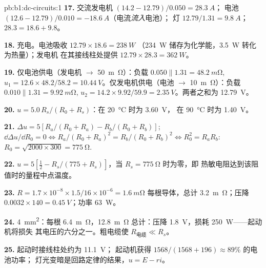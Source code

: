 \begin{solution}{pb:b1:dc-circuits:1}
\textbf{17.} 交流发电机 $(14.2 - 12.79)/0.050 = \qty{28.3}{A}$；
电池 $(12.6 - 12.79)/0.010 = \qty{-18.6}{A}$（电流\emph{流入}电池）；
灯 $12.79/1.31 = \qty{9.8}{A}$；$28.3 = 18.6 + 9.8$。

\textbf{18.} 充电。电池吸收 $12.79 \times 18.6 = \qty{238}{W}$
（\qty{234}{W} 储存为化学能，\qty{3.5}{W} 转化为热量）；发电机
在其接线柱处提供 $12.79 \times 28.3 = \qty{362}{W}$。

\textbf{19.} 仅电池供电（发电机 $\to$ \qty{50}{m\ohm}）：负载
$0.050 \parallel 1.31 = \qty{48.2}{m\ohm}$, $u_1 = 12.6 \times 48.2/58.2 =
\qty{10.44}{V}$。仅发电机供电（电池 $\to$ \qty{10}{m\ohm}）：负载
$0.010 \parallel 1.31 = \qty{9.92}{m\ohm}$, $u_2 = 14.2 \times 9.92/59.9 =
\qty{2.35}{V}$。两者之和为 \qty{12.79}{V}。

\textbf{20.} $u = 5.0\,R_s/(R_0 + R_s)$：在 \qty{20}{\degreeCelsius} 时为 \qty{3.60}{V}，
在 \qty{90}{\degreeCelsius} 时为 \qty{1.40}{V}。

\textbf{21.} $\Delta u = 5[R_a/(R_0 + R_a) - R_b/(R_0 + R_b)]$;
$\dd\Delta u/\dd R_0 = 0 \Leftrightarrow R_a/(R_0 + R_a)^2 = R_b/(R_0 +
R_b)^2 \Leftrightarrow R_0^2 = R_aR_b$: $R_0 = \sqrt{2000 \times 300} =
\qty{775}{\ohm}$.

\textbf{22.} $u = 5[\tfrac12 - R_s/(775 + R_s)]$，当 $R_s =
\qty{775}{\ohm}$ 时为零，即
热敏电阻达到该阻值时的量程中点温度。

\textbf{23.} $R = 1.7\times10^{-8} \times 1.5/16\times10^{-6} =
\qty{1.6}{m\ohm}$ 每根导体，总计 \qty{3.2}{m\ohm}；压降 $0.0032
\times 140 = \qty{0.45}{V}$；功率 \qty{63}{W}。

\textbf{24.} \qty{4}{mm^2}：每根 \qty{6.4}{m\ohm}，\qty{12.8}{m\ohm}
总计：压降 \qty{1.8}{V}，损耗 \qty{250}{W}——起动机将损失
其电压的六分之一。粗电缆使 $R_{\text{电缆}} \ll R_s$。

\textbf{25.} 起动时接线柱处约为 \qty{11.1}{V}；
起动机获得 $1568/(1568 + 196) \approx 89\%$ 的电池功率；
灯光变暗是回路定律的结果，$u = E - ri$。
\end{solution}

